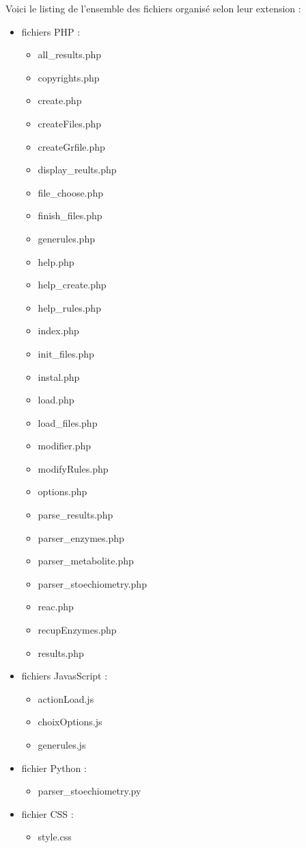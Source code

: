 \documentclass[12pt,a4paper]{report}
\begin{document}
Voici le listing de l'ensemble des fichiers organisé selon leur extension :
\begin{itemize}
\item fichiers PHP :
\begin{itemize}
\item all\_results.php
\item copyrights.php
\item create.php
\item createFiles.php
\item createGrfile.php
\item display\_reults.php
\item file\_choose.php
\item finish\_files.php
\item generules.php
\item help.php
\item help\_create.php
\item help\_rules.php
\item index.php
\item init\_files.php
\item instal.php
\item load.php
\item load\_files.php
\item modifier.php
\item modifyRules.php
\item options.php
\item parse\_results.php
\item parser\_enzymes.php
\item parser\_metabolite.php
\item parser\_stoechiometry.php
\item reac.php
\item recupEnzymes.php
\item results.php
\end{itemize}
\item fichiers JavasScript :
\begin{itemize}
\item actionLoad.js
\item choixOptions.js
\item generules.js 
\end{itemize}
\item fichier Python :
\begin{itemize}
\item parser\_stoechiometry.py
\end{itemize}
\item fichier CSS :
\begin{itemize}
\item style.css
\end{itemize}
\end{itemize} 
\end{document}
